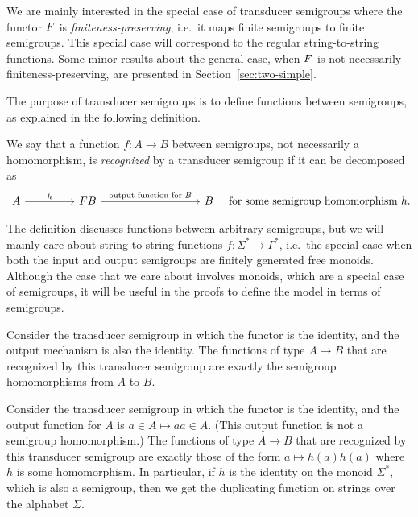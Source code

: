 We are mainly interested in the special case of transducer semigroups where the functor $\functor$ is \emph{finiteness-preserving}, i.e.~it maps finite semigroups to finite semigroups. This special case will correspond to the regular string-to-string functions. Some minor results about the general case, when $\functor$ is not necessarily finiteness-preserving, are presented in Section~\ref{sec:two-simple}.

The purpose of transducer semigroups is to define functions between semigroups, as explained in the following definition. 
\begin{definition}
 We say that a function $f\colon A \to B$ between semigroups, not necessarily a homomorphism, is \emph{recognized} by a transducer semigroup if it can be decomposed as
 \[
 \begin{tikzcd}
 [column sep=1.6cm]
 A 
 \ar[r,"h"]
 &
 \functor B
 \ar[rr,"\text{output function for $B$}"]
 &&
 B
 \end{tikzcd}
 \quad
 \text{for some semigroup homomorphism}\ h.
 \]
\end{definition}
The definition discusses functions between arbitrary semigroups, but we will mainly care about string-to-string functions $f\colon \Sigma^* \to \Gamma^*$, i.e.~the special case when both the input and output semigroups are finitely generated free monoids. Although the case that we care about involves monoids, which are a special case of semigroups, it will be useful in the proofs to define the model in terms of semigroups.

\begin{example}
 Consider the transducer semigroup in which the functor is the identity, and the output mechanism is also the identity. The functions of type $A \to B$ that are recognized by this transducer semigroup are exactly the semigroup homomorphisms from $A$ to $B$.
\end{example}

\begin{example}\label{ex:duplicator}
 Consider the transducer semigroup in which the functor is the identity, and the output function for $A$ is $a \in A \mapsto aa \in A$. (This output function is not a semigroup homomorphism.)
 The functions of type $A \to B$ that are recognized by this transducer semigroup are exactly those of the form $a \mapsto h(a)h(a)$ where $h$ is some homomorphism. In particular, if $h$ is the identity on the monoid $\Sigma^*$, which is also a semigroup, then we get the duplicating function on strings over the alphabet $\Sigma$.
\end{example}



